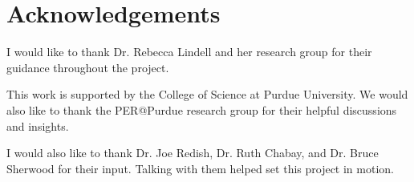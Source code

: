 \chapter[Acknowledgements]{Acknowledgements}

I would like to thank Dr. Rebecca Lindell and her research group for their guidance throughout the project.

This work is supported by the College of Science at Purdue University. We would also like to thank the PER@Purdue research group for their helpful discussions and insights.

I would also like to thank Dr. Joe Redish, Dr. Ruth Chabay, and Dr. Bruce Sherwood for their input. Talking with them helped set this project in motion.